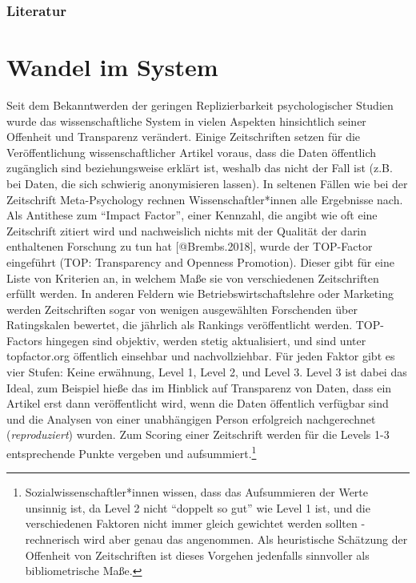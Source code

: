 \documentclass[
  letterpaper,
  DIV=11,
  numbers=noendperiod]{scrreprt}
\begin{document}
\subsection*{Literatur}\label{literatur-3}

\chapter{Wandel im System}\label{wandel-im-system}

Seit dem Bekanntwerden der geringen Replizierbarkeit psychologischer
Studien wurde das wissenschaftliche System in vielen Aspekten
hinsichtlich seiner Offenheit und Transparenz verändert. Einige
Zeitschriften setzen für die Veröffentlichung wissenschaftlicher Artikel
voraus, dass die Daten öffentlich zugänglich sind beziehungsweise
erklärt ist, weshalb das nicht der Fall ist (z.B. bei Daten, die sich
schwierig anonymisieren lassen). In seltenen Fällen wie bei der
Zeitschrift Meta-Psychology rechnen Wissenschaftler*innen alle
Ergebnisse nach. Als Antithese zum ``Impact Factor'', einer Kennzahl,
die angibt wie oft eine Zeitschrift zitiert wird und nachweislich nichts
mit der Qualität der darin enthaltenen Forschung zu tun hat
{[}@Brembs.2018{]}, wurde der TOP-Factor eingeführt (TOP: Transparency
and Openness Promotion). Dieser gibt für eine Liste von Kriterien an, in
welchem Maße sie von verschiedenen Zeitschriften erfüllt werden. In
anderen Feldern wie Betriebswirtschaftslehre oder Marketing werden
Zeitschriften sogar von wenigen ausgewählten Forschenden über
Ratingskalen bewertet, die jährlich als Rankings veröffentlicht werden.
TOP-Factors hingegen sind objektiv, werden stetig aktualisiert, und sind
unter topfactor.org öffentlich einsehbar und nachvollziehbar. Für jeden
Faktor gibt es vier Stufen: Keine erwähnung, Level 1, Level 2, und Level
3. Level 3 ist dabei das Ideal, zum Beispiel hieße das im Hinblick auf
Transparenz von Daten, dass ein Artikel erst dann veröffentlicht wird,
wenn die Daten öffentlich verfügbar sind und die Analysen von einer
unabhängigen Person erfolgreich nachgerechnet (\emph{reproduziert})
wurden. Zum Scoring einer Zeitschrift werden für die Levels 1-3
entsprechende Punkte vergeben und aufsummiert.\footnote{Sozialwissenschaftler*innen
  wissen, dass das Aufsummieren der Werte unsinnig ist, da Level 2 nicht
  ``doppelt so gut'' wie Level 1 ist, und die verschiedenen Faktoren
  nicht immer gleich gewichtet werden sollten - rechnerisch wird aber
  genau das angenommen. Als heuristische Schätzung der Offenheit von
  Zeitschriften ist dieses Vorgehen jedenfalls sinnvoller als
  bibliometrische Maße.}
\end{document}
